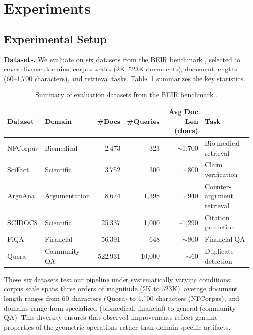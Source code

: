 \documentclass[review,1p]{elsarticle}
\begin{document}
\section{Experiments}
\label{sec:experiments}

\subsection{Experimental Setup}
\label{subsec:setup}

\textbf{Datasets.} We evaluate on six datasets from the BEIR benchmark \citep{thakur2021beir}, selected to cover diverse domains, corpus scales (2K--523K documents), document lengths (60--1,700 characters), and retrieval tasks. Table~\ref{tab:datasets} summarizes the key statistics.

\begin{table}[ht]
\centering
\caption{Summary of evaluation datasets from the BEIR benchmark \citep{thakur2021beir}.}
\label{tab:datasets}
\footnotesize
\begin{tabular}{llrrrl}
\toprule
Dataset & Domain & \#Docs & \#Queries & Avg Doc Len (chars) & Task \\
\midrule
NFCorpus & Biomedical & 2{,}473 & 323 & ${\sim}$1{,}700 & Bio-medical retrieval \\
SciFact & Scientific & 3{,}752 & 300 & ${\sim}$800 & Claim verification \\
ArguAna & Argumentation & 8{,}674 & 1{,}398 & ${\sim}$940 & Counter-argument retrieval \\
SCIDOCS & Scientific & 25{,}337 & 1{,}000 & ${\sim}$1{,}290 & Citation prediction \\
FiQA & Financial & 56{,}391 & 648 & ${\sim}$800 & Financial QA \\
Quora & Community QA & 522{,}931 & 10{,}000 & ${\sim}$60 & Duplicate detection \\
\bottomrule
\end{tabular}
\end{table}

These six datasets test our pipeline under systematically varying conditions: corpus scale spans three orders of magnitude (2K to 523K), average document length ranges from 60 characters (Quora) to 1,700 characters (NFCorpus), and domains range from specialized (biomedical, financial) to general (community QA). This diversity ensures that observed improvements reflect genuine properties of the geometric operations rather than domain-specific artifacts.
\end{document}
